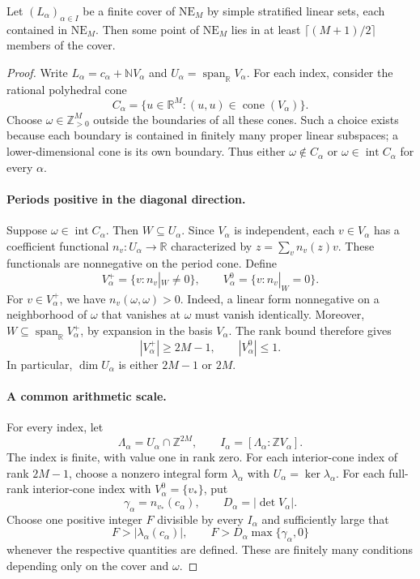 \documentclass[a4paper,USenglish,cleveref,autoref]{lipics-v2021}
\newcommand{\N}{\mathbb N}
\newcommand{\Z}{\mathbb Z}
\newcommand{\R}{\mathbb R}
\newcommand{\NE}{\mathrm{NE}}
\newcommand{\spanR}{\operatorname{span}_{\R}}
\newcommand{\cone}{\operatorname{cone}}
\begin{document}
\begin{theorem}\label{thm:cover}
Let $(L_\alpha)_{\alpha\in I}$ be a finite cover of $\NE_M$ by simple stratified linear sets, each contained in $\NE_M$.
Then some point of $\NE_M$ lies in at least $\lceil(M+1)/2\rceil$ members of the cover.
\end{theorem}
\begin{proof}
Write $L_\alpha=c_\alpha+\N V_\alpha$ and $U_\alpha=\spanR V_\alpha$.
For each index, consider the rational polyhedral cone
\begin{equation}\label{eq:C}
 C_\alpha=\{u\in\R^M:(u,u)\in\cone(V_\alpha)\}.
\end{equation}
Choose $\omega\in\Z_{>0}^M$ outside the boundaries of all these cones.
Such a choice exists because each boundary is contained in finitely many proper linear subspaces; a lower-dimensional cone is its own boundary.
Thus either $\omega\notin C_\alpha$ or $\omega\in\operatorname{int}C_\alpha$ for every $\alpha$.

\paragraph{Periods positive in the diagonal direction.}
Suppose $\omega\in\operatorname{int}C_\alpha$.
Then $W\subseteq U_\alpha$.
Since $V_\alpha$ is independent, each $v\in V_\alpha$ has a coefficient functional $n_v:U_\alpha\to\R$ characterized by $z=\sum_v n_v(z)v$.
These functionals are nonnegative on the period cone.
Define
\[
 V_\alpha^+=\{v:n_v|_W\ne0\},\qquad
 V_\alpha^0=\{v:n_v|_W=0\}.
\]
For $v\in V_\alpha^+$, we have $n_v(\omega,\omega)>0$.
Indeed, a linear form nonnegative on a neighborhood of $\omega$ that vanishes at $\omega$ must vanish identically.
Moreover, $W\subseteq\spanR V_\alpha^+$, by expansion in the basis $V_\alpha$.
The rank bound therefore gives
\begin{equation}\label{eq:positive}
 |V_\alpha^+|\geq2M-1,\qquad |V_\alpha^0|\leq1.
\end{equation}
In particular, $\dim U_\alpha$ is either $2M-1$ or $2M$.

\paragraph{A common arithmetic scale.}
For every index, let
\[
 \Lambda_\alpha=U_\alpha\cap\Z^{2M},\qquad
 I_\alpha=[\Lambda_\alpha:\Z V_\alpha].
\]
The index is finite, with value one in rank zero.
For each interior-cone index of rank $2M-1$, choose a nonzero integral form $\lambda_\alpha$ with $U_\alpha=\ker\lambda_\alpha$.
For each full-rank interior-cone index with $V_\alpha^0=\{v_*\}$, put
\[
 \gamma_\alpha=n_{v_*}(c_\alpha),\qquad
 D_\alpha=|\det V_\alpha|.
\]
Choose one positive integer $F$ divisible by every $I_\alpha$ and sufficiently large that
\begin{equation}\label{eq:F}
 F>|\lambda_\alpha(c_\alpha)|,
 \qquad F>D_\alpha\max\{\gamma_\alpha,0\}
\end{equation}
whenever the respective quantities are defined.
These are finitely many conditions depending only on the cover and $\omega$.


\end{proof}
\end{document}
